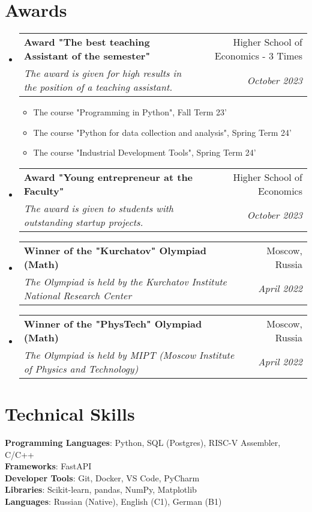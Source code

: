 \documentclass[letterpaper,11pt]{article}
\makeatletter
\newcommand{\resumeItem}[1]{
  \item\small{
    {#1 \vspace{-2pt}}
  }
}
\newcommand{\resumeSubheading}[4]{
  \vspace{-2pt}\item
    \begin{tabular*}{0.97\textwidth}[t]{l@{\extracolsep{\fill}}r}
      \textbf{#1} & #2 \\
      \textit{\small#3} & \textit{\small #4} \\
    \end{tabular*}\vspace{-7pt}
}
\newcommand{\resumeSubHeadingListStart}{\begin{itemize}[leftmargin=0.15in, label={}]}
\newcommand{\resumeSubHeadingListEnd}{\end{itemize}}
\newcommand{\resumeItemListStart}{\begin{itemize}}
\newcommand{\resumeItemListEnd}{\end{itemize}\vspace{-5pt}}
\makeatother
\begin{document}
\section{Awards}

  \resumeSubHeadingListStart
    \resumeSubheading
      {Award "The best teaching Assistant of the semester"}{Higher School of Economics - 3 Times}
      {The award is given for high results in the position of a teaching assistant.}{October 2023}
        \resumeItemListStart
            \resumeItem{The course "Programming in Python", Fall Term 23'}
            \resumeItem{The course "Python for data collection and analysis", Spring Term 24'}
            \resumeItem{The course "Industrial Development Tools", Spring Term 24'}
          \resumeItemListEnd

    \resumeSubheading
      {Award "Young entrepreneur at the Faculty"}{Higher School of Economics}
      {The award is given to students with outstanding startup projects.}{October 2023}

    \resumeSubheading
      {Winner of the "Kurchatov" Olympiad (Math)}{Moscow, Russia}
      {The Olympiad is held by the Kurchatov Institute National Research Center}{April 2022}

    \resumeSubheading
      {Winner of the "PhysTech" Olympiad (Math)}{Moscow, Russia}
      {The Olympiad is held by MIPT (Moscow Institute of Physics and Technology) }{April 2022}

  \resumeSubHeadingListEnd



%
\section{Technical Skills}
 \begin{itemize}[leftmargin=0.15in, label={}]
    \small{\item{
     \textbf{Programming Languages}{: Python, SQL (Postgres), RISC-V Assembler, C/C++} \\
     \textbf{Frameworks}{: FastAPI} \\
     \textbf{Developer Tools}{: Git, Docker, VS Code, PyCharm} \\
     \textbf{Libraries}{: Scikit-learn, pandas, NumPy, Matplotlib} \\
     \textbf{Languages}{: Russian (Native), English (C1), German (B1)}
    }}
 \end{itemize}


\end{document}
